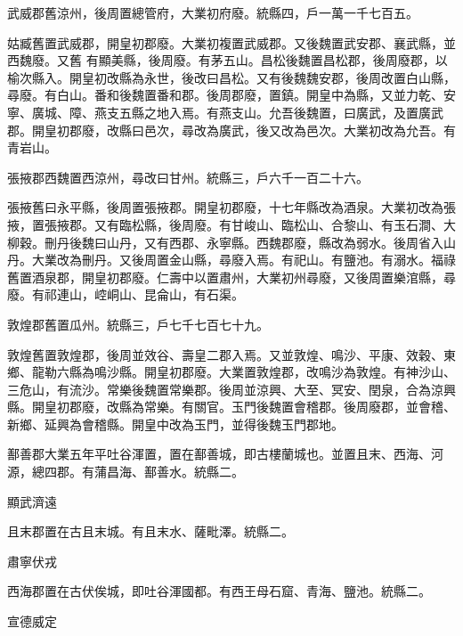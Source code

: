 \begin{pinyinscope}
 武威郡舊涼州，後周置總管府，大業初府廢。統縣四，戶一萬一千七百五。



 姑臧舊置武威郡，開皇初郡廢。大業初複置武威郡。又後魏置武安郡、襄武縣，並西魏廢。又舊
 有顯美縣，後周廢。有茅五山。昌松後魏置昌松郡，後周廢郡，以榆次縣入。開皇初改縣為永世，後改曰昌松。又有後魏魏安郡，後周改置白山縣，尋廢。有白山。番和後魏置番和郡。後周郡廢，置鎮。開皇中為縣，又並力乾、安寧、廣城、障、燕支五縣之地入焉。有燕支山。允吾後魏置，曰廣武，及置廣武郡。開皇初郡廢，改縣曰邑次，尋改為廣武，後又改為邑次。大業初改為允吾。有青岩山。



 張掖郡西魏置西涼州，尋改曰甘州。統縣三，戶六千一百二十六。



 張掖舊曰永平縣，後周置張掖郡。開皇初郡廢，十七年縣改為酒泉。大業初改為張掖，置張掖郡。又有臨松縣，後周廢。有甘峻山、臨松山、合黎山、有玉石澗、大柳穀。刪丹後魏曰山丹，又有西郡、永寧縣。西魏郡廢，縣改為弱水。後周省入山丹。大業改為刪丹。又後周置金山縣，尋廢入焉。有祀山。有鹽池。有溺水。福祿舊置酒泉郡，開皇初郡廢。仁壽中以置肅州，大業初州尋廢，又後周置樂涫縣，尋廢。有祁連山，崆峒山、昆侖山，有石渠。



 敦煌郡舊置瓜州。統縣三，戶七千七百七十九。



 敦煌舊置敦煌郡，後周並效谷、壽皇二郡入焉。又並敦煌、鳴沙、平康、效穀、東鄉、龍勒六縣為鳴沙縣。開皇初郡廢。大業置敦煌郡，改鳴沙為敦煌。有神沙山、三危山，有流沙。常樂後魏置常樂郡。後周並涼興、大至、冥安、閏泉，合為涼興縣。開皇初郡廢，改縣為常樂。有關官。玉門後魏置會稽郡。後周廢郡，並會稽、新鄉、延興為會稽縣。開皇中改為玉門，並得後魏玉門郡地。



 鄯善郡大業五年平吐谷渾置，置在鄯善城，即古樓蘭城也。並置且末、西海、河源，總四郡。有蒲昌海、鄯善水。統縣二。



 顯武濟遠



 且末郡置在古且末城。有且末水、薩毗澤。統縣二。



 肅寧伏戎



 西海郡置在古伏俟城，即吐谷渾國都。有西王母石窟、青海、鹽池。統縣二。



 宣德威定




\end{pinyinscope}
